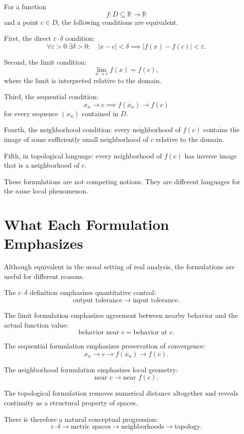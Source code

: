 \documentclass{essay}
\begin{document}
For a function
\[
f:D\subseteq\mathbb R\to\mathbb R
\]
and a point $c\in D$, the following conditions are equivalent.

First, the direct $\varepsilon$--$\delta$ condition:
\[
\forall\varepsilon>0\;\exists\delta>0:
\quad
|x-c|<\delta
\implies
|f(x)-f(c)|<\varepsilon.
\]

Second, the limit condition:
\[
\lim_{x\to c}f(x)=f(c),
\]
where the limit is interpreted relative to the domain.

Third, the sequential condition:
\[
x_n\to c
\implies
f(x_n)\to f(c)
\]
for every sequence $(x_n)$ contained in $D$.

Fourth, the neighborhood condition: every neighborhood of $f(c)$ contains the image of some sufficiently small neighborhood of $c$ relative to the domain.

Fifth, in topological language: every neighborhood of $f(c)$ has inverse image that is a neighborhood of $c$.

These formulations are not competing notions. They are different languages for the same local phenomenon.

\section{What Each Formulation Emphasizes}

Although equivalent in the usual setting of real analysis, the formulations are useful for different reasons.

The $\varepsilon$--$\delta$ definition emphasizes quantitative control:
\[
\text{output tolerance}
\longrightarrow
\text{input tolerance}.
\]

The limit formulation emphasizes agreement between nearby behavior and the actual function value:
\[
\text{behavior near }c
=
\text{behavior at }c.
\]

The sequential formulation emphasizes preservation of convergence:
\[
x_n\to c
\longrightarrow
f(x_n)\to f(c).
\]

The neighborhood formulation emphasizes local geometry:
\[
\text{near }c
\longrightarrow
\text{near }f(c).
\]

The topological formulation removes numerical distance altogether and reveals continuity as a structural property of spaces.

There is therefore a natural conceptual progression:
\[
\boxed{
\varepsilon\text{--}\delta
\longrightarrow
\text{metric spaces}
\longrightarrow
\text{neighborhoods}
\longrightarrow
\text{topology}.
}
\]
\end{document}
